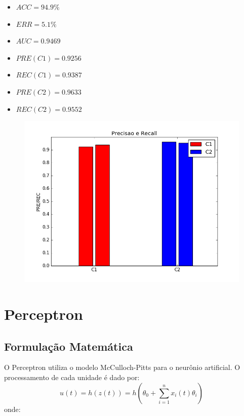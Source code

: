\documentclass[11pt,a4paper]{article}
\numberwithin{equation}{section}
\begin{document}
\begin{minipage}{.5\textwidth}
\begin{itemize}
\item $ACC =  94.9 \%$
\item $ERR =  5.1 \%$
\item $AUC =  0.9469 $
\item $PRE(C1) =  0.9256 $
\item $REC(C1) =  0.9387 $
\item $PRE(C2) =  0.9633 $
\item $REC(C2) =  0.9552 $
\end{itemize}
\end{minipage}%
\begin{minipage}{.5\textwidth}
\begin{figure}[H]
\centering
  \includegraphics[width=\linewidth]{../img/log_reg_rec_std.png}
  \label{fig:percep}
\end{figure}
\end{minipage}%

\section{Perceptron}
\subsection{Formulação Matemática}
O Perceptron utiliza o modelo McCulloch-Pitts para o neurônio artificial. O processamento de cada unidade é dado por:
\[ u(t) = h(z(t)) = h \left( \theta_0 + \sum_{i=1}^n x_i(t) \theta_i \right) \]
onde:
\end{document}
